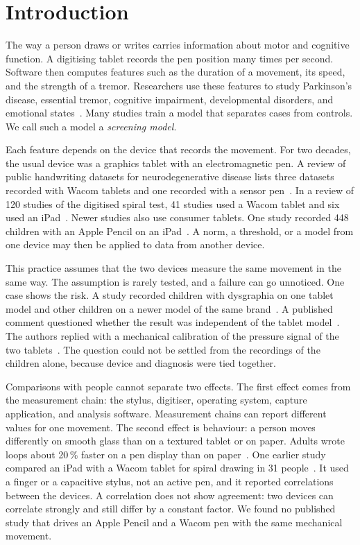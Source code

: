 \section{Introduction}
\label{sec:introduction}
The way a person draws or writes carries information about motor and cognitive function.
A digitising tablet records the pen position many times per second.
Software then computes features such as the duration of a movement, its speed, and the strength of a tremor.
Researchers use these features to study Parkinson's disease, essential tremor, cognitive impairment, developmental disorders, and emotional states~\cite{Impedovo2019,Thomas2017,Elble2017,Toffoli2025,Asselborn2018,LikformanSulem2017}.
Many studies train a model that separates cases from controls.
We call such a model a \emph{screening model}.

Each feature depends on the device that records the movement.
For two decades, the usual device was a graphics tablet with an electromagnetic pen.
A review of public handwriting datasets for neurodegenerative disease lists three datasets recorded with Wacom tablets and one recorded with a sensor pen~\cite{Vessio2019}.
In a review of 120 studies of the digitised spiral test, 41 studies used a Wacom tablet and six used an iPad~\cite{Wang2025}.
Newer studies also use consumer tablets.
One study recorded 448 children with an Apple Pencil on an iPad~\cite{Asselborn2020}.
A norm, a threshold, or a model from one device may then be applied to data from another device.

This practice assumes that the two devices measure the same movement in the same way.
The assumption is rarely tested, and a failure can go unnoticed.
One case shows the risk.
A study recorded children with dysgraphia on one tablet model and other children on a newer model of the same brand~\cite{Asselborn2018}.
A published comment questioned whether the result was independent of the tablet model~\cite{Deschamps2019}.
The authors replied with a mechanical calibration of the pressure signal of the two tablets~\cite{Asselborn2019}.
The question could not be settled from the recordings of the children alone, because device and diagnosis were tied together.

Comparisons with people cannot separate two effects.
The first effect comes from the measurement chain: the stylus, digitiser, operating system, capture application, and analysis software.
Measurement chains can report different values for one movement.
The second effect is behaviour: a person moves differently on smooth glass than on a textured tablet or on paper.
Adults wrote loops about 20\,\% faster on a pen display than on paper~\cite{Gerth2016b}.
One earlier study compared an iPad with a Wacom tablet for spiral drawing in 31 people~\cite{Sisti2017}.
It used a finger or a capacitive stylus, not an active pen, and it reported correlations between the devices.
A correlation does not show agreement: two devices can correlate strongly and still differ by a constant factor.
We found no published study that drives an Apple Pencil and a Wacom pen with the same mechanical movement.

